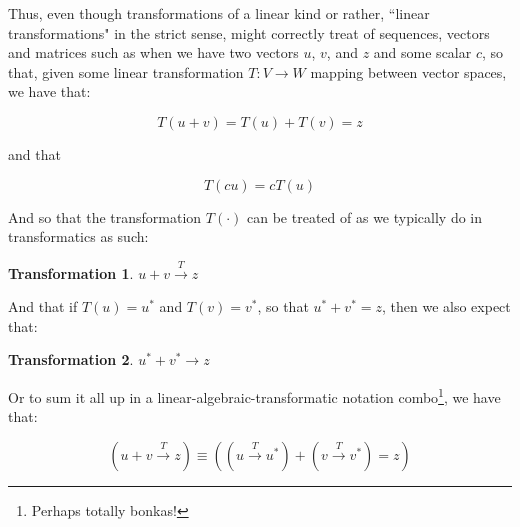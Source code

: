 \documentclass[a4paper, 18pt]{book} %
\newtheorem{trans}{Transformation}
\begin{document}
\begin{appendices}
\vspace{2em}

Thus, even though transformations of a linear kind or rather, ``linear transformations" in the strict sense, might correctly treat of sequences, vectors and matrices such as when we have two vectors $u$, $v$, and $z$ and some scalar $c$, so that, given some linear transformation $T: V \rightarrow W$ mapping between vector spaces, we have that:

\vspace{2em}

\begin{equation}
T(u + v) = T(u) + T(v) = z
\end{equation}

\vspace{2em}

and that

\vspace{2em}

\begin{equation}
T(cu) = cT(u)
\end{equation}

\vspace{2em}

And so that the transformation $T(\cdot)$ can be treated of as we typically do in transformatics as such:

\vspace{2em}

\begin{trans}
$u + v \xrightarrow{T} z$
\end{trans}

\vspace{2em}

And that if $T(u) = u^*$ and $T(v) = v^*$, so that $u^* + v^* = z$, then we also expect that:

\vspace{2em}

\begin{trans}
$u^* + v^* \rightarrow z$
\end{trans}

\vspace{2em}

Or to sum it all up in a linear-algebraic-transformatic notation combo\footnote{Perhaps totally bonkas!}, we have that:

\vspace{2em}

\begin{equation}
\label{EQAXIOMALG}
(u + v \xrightarrow{T} z) \equiv ((u \xrightarrow{T} u^*) + (v \xrightarrow{T} v^*) = z)
\end{equation}


\end{appendices}
\end{document}
